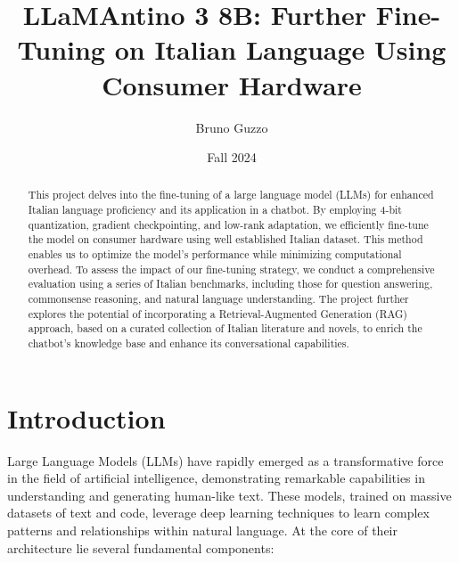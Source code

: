 \documentclass{article}
\title{LLaMAntino 3 8B: Further Fine-Tuning on Italian Language Using Consumer Hardware}
\author{Bruno Guzzo}
\date{Fall 2024}
\begin{document}
	
	\maketitle
	
	\begin{abstract}
		This project delves into the fine-tuning of a large language model (LLMs) for enhanced Italian language proficiency and its application in a chatbot.
		By employing 4-bit quantization, gradient checkpointing, and low-rank adaptation, we efficiently fine-tune the model on consumer hardware using well established Italian  dataset. 
		This method enables us to optimize the model's performance while minimizing computational overhead.
		To assess the impact of our fine-tuning strategy, we conduct a comprehensive evaluation using a series of Italian benchmarks, including those for question answering, commonsense reasoning, and natural language understanding.
		The project further explores the potential of incorporating a Retrieval-Augmented Generation (RAG) approach, based on a curated collection of Italian literature and novels, to enrich the chatbot's knowledge base and enhance its conversational capabilities.
	\end{abstract}
	
	\section{Introduction}
		Large Language Models (LLMs) have rapidly emerged as a transformative force in the field of artificial intelligence, demonstrating remarkable capabilities in understanding and generating human-like text. 
		These models, trained on massive datasets of text and code, leverage deep learning techniques to learn complex patterns and relationships within natural language. 
		At the core of their architecture lie several fundamental components:
		
\end{document}
